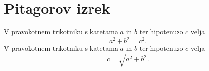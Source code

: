 \documentclass{article}
\begin{document}
\section*{Pitagorov izrek}
V pravokotnem trikotniku s katetama \(a\) in \(b\) ter hipotenuzo \(c\) velja
\[ a^2 + b^2 = c^2. \]
V pravokotnem trikotniku s katetama \(a\) in \(b\) ter hipotenuzo \(c\) velja
\[c = \sqrt{a^2 + b^2}.\]
\end{document}
